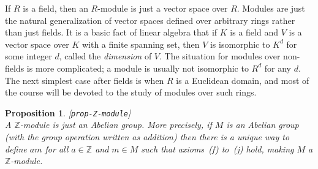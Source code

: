 \documentclass{amsart}
\newcommand{\lbl}[1]{\label{#1}\textup{[\texttt{#1}]}\ \\}
\newcommand{\lbl}{\label}
\newcommand{\Z}         {{\mathbb{Z}}}
\renewcommand{\:}{\colon}
\newtheorem{proposition}[theorem]{Proposition}
\theoremstyle{definition}
\begin{document}
If $R$ is a field, then an $R$-module is just a vector space over
$R$.  Modules are just the natural generalization of vector spaces
defined over arbitrary rings rather than just fields.  It is a basic
fact of linear algebra that if $K$ is a field and $V$ is a vector
space over $K$ with a finite spanning set, then $V$ is isomorphic to
$K^d$ for some integer $d$, called the \emph{dimension} of $V$.  The
situation for modules over non-fields is more complicated; a module is
usually not isomorphic to $R^d$ for any $d$.  The next simplest case
after fields is when $R$ is a Euclidean domain, and most of the course
will be devoted to the study of modules over such rings.  

\begin{proposition}\lbl{prop-Z-module}
 A $\Z$-module is just an Abelian group.  More precisely, if $M$ is an
 Abelian group (with the group operation written as addition) then
 there is a unique way to define $am$ for all $a\in\Z$ and $m\in M$
 such that axioms~(f) to~(j) hold, making $M$ a $\Z$-module.
\end{proposition}
\end{document}
